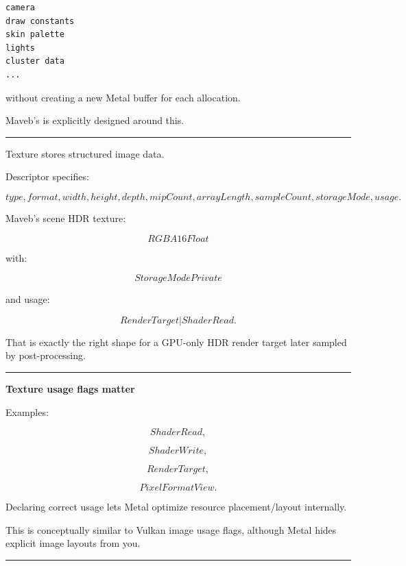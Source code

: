 \begin{verbatim}
camera
draw constants
skin palette
lights
cluster data
...
\end{verbatim}

without creating a new Metal buffer for each allocation.

Maveb's  is explicitly designed around this.

\begin{center}\rule{0.5\linewidth}{0.5pt}\end{center}

\textbf{}

Texture stores structured image data.

Descriptor specifies:

\[
type,
format,
width,
height,
depth,
mipCount,
arrayLength,
sampleCount,
storageMode,
usage.
\]

Maveb's scene HDR texture:

\[
RGBA16Float
\]

with:

\[
StorageModePrivate
\]

and usage:

\[
RenderTarget
|
ShaderRead.
\]

That is exactly the right shape for a GPU-only HDR render target later sampled by post-processing.

\begin{center}\rule{0.5\linewidth}{0.5pt}\end{center}

\textbf{Texture usage flags matter}

Examples:

\[
ShaderRead,
\]

\[
ShaderWrite,
\]

\[
RenderTarget,
\]

\[
PixelFormatView.
\]

Declaring correct usage lets Metal optimize resource placement/layout internally.

This is conceptually similar to Vulkan image usage flags, although Metal hides explicit image layouts from you.

\begin{center}\rule{0.5\linewidth}{0.5pt}\end{center}

\textbf{}

